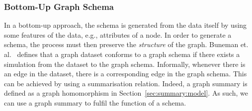 \subsubsection{Bottom-Up Graph Schema}

In a bottom-up approach, the schema is generated from the data itself by using some features of the data, e.g., attributes of a node. In order to generate a schema, the process must then preserve the \emph{structure} of the graph. %
Buneman et. al.~\cite{buneman:1997:asu} defines that a graph dataset conforms to a graph schema if there exists a simulation from the dataset to the graph schema. Informally, whenever there is an edge in the dataset, there is a corresponding edge in the graph schema. 
This can be achieved by using a summarisation relation. Indeed, a graph summary is defined as a graph homomorphism in Section~\ref{sec:summary:model}. As such, we can use a graph summary to fulfil the function of a schema.




